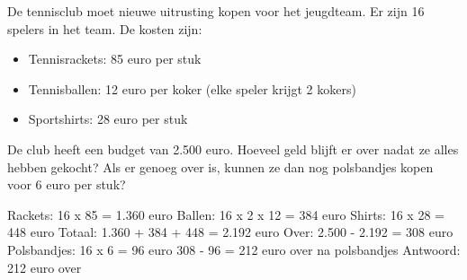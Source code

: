 \begin{opgave}
De tennisclub moet nieuwe uitrusting kopen voor het jeugdteam. Er zijn 16 spelers in het team.
De kosten zijn:

\begin{itemize}
\item Tennisrackets: 85 euro per stuk
\item Tennisballen: 12 euro per koker (elke speler krijgt 2 kokers)
\item Sportshirts: 28 euro per stuk
\end{itemize}

De club heeft een budget van 2.500 euro. Hoeveel geld blijft er over nadat ze alles hebben
gekocht? Als er genoeg over is, kunnen ze dan nog polsbandjes kopen voor 6 euro per stuk?
\end{opgave}

\begin{oplossing}
Rackets: 16 x 85 = 1.360 euro
Ballen: 16 x 2 x 12 = 384 euro  
Shirts: 16 x 28 = 448 euro
Totaal: 1.360 + 384 + 448 = 2.192 euro
Over: 2.500 - 2.192 = 308 euro
Polsbandjes: 16 x 6 = 96 euro
308 - 96 = 212 euro over na polsbandjes
Antwoord: 212 euro over
\end{oplossing}